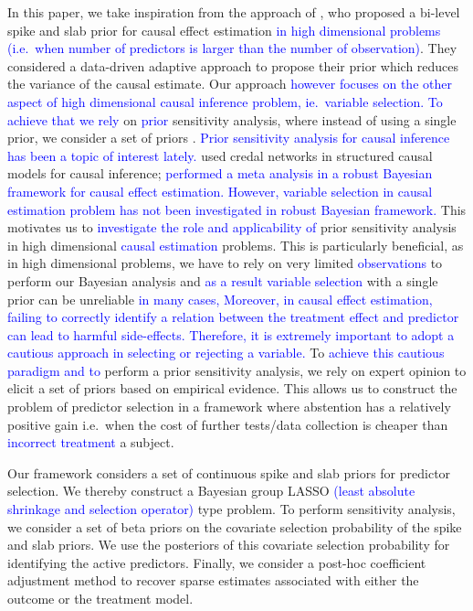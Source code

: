\documentclass[preprint,12pt]{elsarticle}
\newcommand{\added}[1]{\textcolor{blue}{#1}}
\begin{document}
In this paper, we take inspiration from the approach of \citet{koch2020}, who proposed a bi-level spike and slab prior for causal effect estimation \added{in high dimensional problems (i.e.~when number of predictors
	is larger than the number of observation)}. 
	They considered a data-driven adaptive approach to
propose their prior which reduces the variance of the causal estimate. 
Our approach \added{however focuses on the other aspect of high
dimensional causal inference problem, ie.~variable selection. To achieve that we rely} on \added{prior}
sensitivity analysis, where instead of using a single prior, 
we consider a set of priors \citep{BERGER1990303}. 
\added{Prior sensitivity analysis for causal inference has
been a topic of interest lately.} \citet{zaffalon20a} 
used credal networks in structured causal models
for causal inference; \citet{raices_cruz22} \added{performed 
	a meta analysis in a robust Bayesian framework for causal effect estimation. However, variable selection in causal estimation
	problem has not been investigated in robust Bayesian framework.} 
This motivates us to \added{investigate the role and applicability of} prior sensitivity analysis in high dimensional \added{causal estimation} problems. This is particularly beneficial, as
in high dimensional problems,
we have to rely on very limited \added{observations} to perform our Bayesian analysis and
\added{as a result variable selection} with a single prior
can be unreliable \citep{basu2023robust} \added{in many cases, Moreover, in causal effect estimation, failing to correctly identify a relation between the treatment effect and predictor can lead to
harmful side-effects. Therefore, it
is extremely important to adopt a cautious approach in selecting
or rejecting a variable.}
To \added{achieve this cautious paradigm and to} perform a prior sensitivity analysis, we rely on expert opinion to elicit a set of priors 
based on empirical evidence. 
This allows us to construct the problem of 
predictor selection
in a framework where abstention has a relatively positive gain i.e.~when the cost of further tests/data collection is cheaper than
\added{incorrect treatment} a subject. 

Our framework considers a set of continuous spike and slab priors 
\citep{ishwaran2005} for
predictor selection.
We thereby construct a Bayesian group LASSO \added{(least absolute shrinkage and selection operator)} \citep{xu2015} type problem.
To perform sensitivity analysis,
we consider a set of beta priors on the covariate selection 
probability of the spike and slab priors. We use the posteriors of this
covariate selection probability for identifying the active predictors. Finally, 
we consider a post-hoc coefficient adjustment method \citep{hahn2015}
to recover sparse estimates associated with either the outcome or the
treatment model. 
\end{document}
